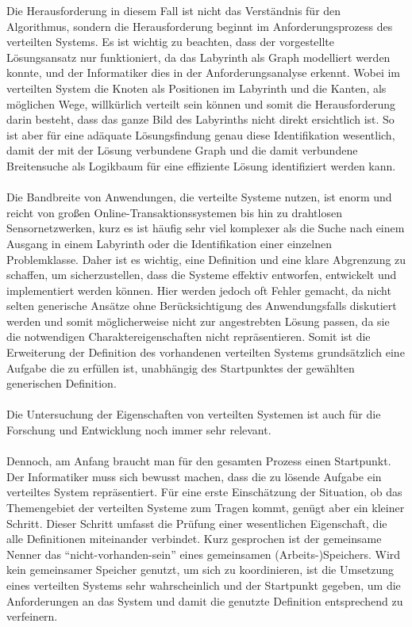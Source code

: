 Die Herausforderung in diesem Fall ist nicht das Verständnis für den Algorithmus, sondern die Herausforderung beginnt im Anforderungsprozess des verteilten Systems. Es ist wichtig zu beachten, dass der vorgestellte Lösungsansatz nur funktioniert, da das Labyrinth als Graph modelliert werden konnte, und der Informatiker dies in der Anforderungsanalyse erkennt. Wobei im verteilten System die Knoten als Positionen im Labyrinth und die Kanten, als  möglichen Wege, willkürlich verteilt sein können und somit die Herausforderung darin besteht, dass das ganze Bild des Labyrinths nicht direkt ersichtlich ist. So ist aber für eine adäquate Lösungsfindung genau diese Identifikation wesentlich, damit der mit der Lösung verbundene Graph und die damit verbundene Breitensuche als Logikbaum für eine effiziente Lösung identifiziert werden kann. 
\\\\
Die Bandbreite von Anwendungen, die verteilte Systeme nutzen, ist enorm und reicht von großen Online-Transaktionssystemen bis hin zu drahtlosen Sensornetzwerken, kurz es ist häufig sehr viel komplexer als die Suche nach einem Ausgang in einem Labyrinth oder die Identifikation einer einzelnen Problemklasse. Daher ist es wichtig, eine Definition und eine klare Abgrenzung zu schaffen, um sicherzustellen, dass die Systeme effektiv entworfen, entwickelt und implementiert werden können. Hier werden jedoch oft Fehler gemacht, da nicht selten generische Ansätze ohne Berücksichtigung des Anwendungsfalls diskutiert werden und somit möglicherweise nicht zur angestrebten Lösung passen, da sie die notwendigen Charaktereigenschaften nicht repräsentieren. Somit ist die Erweiterung der Definition des vorhandenen verteilten Systems grundsätzlich eine Aufgabe die zu erfüllen ist, unabhängig des Startpunktes der gewählten generischen Definition.
\\\\
Die Untersuchung der Eigenschaften von verteilten Systemen ist auch für die Forschung und Entwicklung noch immer sehr relevant.
\\\\
Dennoch, am Anfang braucht man für den gesamten Prozess einen Startpunkt. Der Informatiker muss sich bewusst machen, dass die zu lösende Aufgabe ein verteiltes System repräsentiert. Für eine erste Einschätzung der Situation, ob das Themengebiet der verteilten Systeme zum Tragen kommt, genügt aber ein kleiner Schritt. Dieser Schritt umfasst die Prüfung einer wesentlichen Eigenschaft, die alle Definitionen miteinander verbindet.  Kurz gesprochen ist der gemeinsame Nenner das \enquote{nicht-vorhanden-sein} eines gemeinsamen (Arbeits-)Speichers. Wird kein gemeinsamer Speicher genutzt, um sich zu koordinieren, ist die Umsetzung eines verteilten Systems sehr wahrscheinlich und der Startpunkt gegeben, um die Anforderungen an das System und damit die genutzte Definition entsprechend zu verfeinern.
